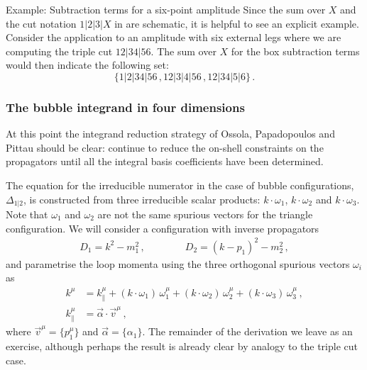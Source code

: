 \begin{example}{Example: Subtraction terms for a six-point amplitude}
  Since the sum over $X$ and the cut notation $1|2|3|X$ in 
  are schematic, it is helpful to see an explicit example. Consider the
  application to an amplitude with six external legs where we are computing the
  triple cut $12|34|56$. The sum over $X$ for the box subtraction terms would
  then indicate the following set:
  \begin{equation}
    \bigl\{ 1|2|34|56 \,, 12|3|4|56 \,, 12|34|5|6 \bigr\}\,.
  \end{equation}
\end{example}

\subsubsection{The bubble integrand in four dimensions}

At this point the integrand reduction strategy of Ossola, Papadopoulos and
Pittau should be clear: continue to reduce the on-shell constraints on the
propagators until all the integral basis coefficients have been determined.

The equation for the irreducible numerator in the case of bubble
configurations, $\Delta_{1|2}$, is constructed from three irreducible scalar
products: $k\cdot\omega_1$, $k\cdot\omega_2$ and $k\cdot\omega_3$. Note that
$\omega_1$ and $\omega_2$ are not the same spurious vectors for the triangle
configuration. We will consider a configuration with inverse propagators
\begin{align}
  D_1 = k^2-m_1^2 \,, \qquad \qquad D_2 = (k-p_1)^2 - m_2^2 \,,
  \label{eq:bubbleprops}
\end{align}
and parametrise the loop momenta using the three orthogonal spurious vectors $\omega_i$ as
\begin{align}   \label{eq:momparambubble}
  k^\mu & = k^{\mu}_{\parallel} + (k\cdot\omega_1) \, \omega_1^\mu + (k\cdot\omega_2) \, \omega_2^\mu + (k\cdot\omega_3) \, \omega_3^\mu \,, \\
  k^{\mu}_{\parallel} & = \vec{\alpha} \cdot \vec{v}^\mu \,,
\end{align}
where $\vec{v}^\mu = \{p_1^\mu\}$ and $\vec{\alpha}=\{\alpha_1\}$. The remainder of the derivation we leave as an exercise, although perhaps the result is already clear by analogy to the triple cut case.


